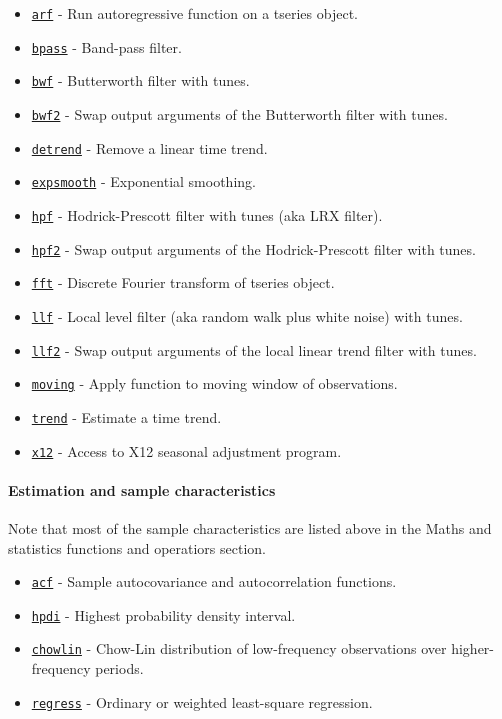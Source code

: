 \begin{itemize}
\itemsep1pt\parskip0pt
\item
  \href{tseries/arf}{\texttt{arf}} - Run autoregressive function on a
  tseries object.
\item
  \href{tseries/bpass}{\texttt{bpass}} - Band-pass filter.
\item
  \href{tseries/bwf}{\texttt{bwf}} - Butterworth filter with tunes.
\item
  \href{tseries/bwf2}{\texttt{bwf2}} - Swap output arguments of the
  Butterworth filter with tunes.
\item
  \href{tseries/detrend}{\texttt{detrend}} - Remove a linear time trend.
\item
  \href{tseries/expsmooth}{\texttt{expsmooth}} - Exponential smoothing.
\item
  \href{tseries/hpf}{\texttt{hpf}} - Hodrick-Prescott filter with tunes
  (aka LRX filter).
\item
  \href{tseries/hpf2}{\texttt{hpf2}} - Swap output arguments of the
  Hodrick-Prescott filter with tunes.
\item
  \href{tseries/fft}{\texttt{fft}} - Discrete Fourier transform of
  tseries object.
\item
  \href{tseries/llf}{\texttt{llf}} - Local level filter (aka random walk
  plus white noise) with tunes.
\item
  \href{tseries/llf2}{\texttt{llf2}} - Swap output arguments of the
  local linear trend filter with tunes.
\item
  \href{tseries/moving}{\texttt{moving}} - Apply function to moving
  window of observations.
\item
  \href{tseries/trend}{\texttt{trend}} - Estimate a time trend.
\item
  \href{tseries/x12}{\texttt{x12}} - Access to X12 seasonal adjustment
  program.
\end{itemize}

\paragraph{Estimation and sample
characteristics}\label{estimation-and-sample-characteristics}

Note that most of the sample characteristics are listed above in the
Maths and statistics functions and operatiors section.

\begin{itemize}
\itemsep1pt\parskip0pt
\item
  \href{tseries/acf}{\texttt{acf}} - Sample autocovariance and
  autocorrelation functions.
\item
  \href{tseries/hpdi}{\texttt{hpdi}} - Highest probability density
  interval.
\item
  \href{tseries/chowlin}{\texttt{chowlin}} - Chow-Lin distribution of
  low-frequency observations over higher-frequency periods.
\item
  \href{tseries/regress}{\texttt{regress}} - Ordinary or weighted
  least-square regression.
\end{itemize}

